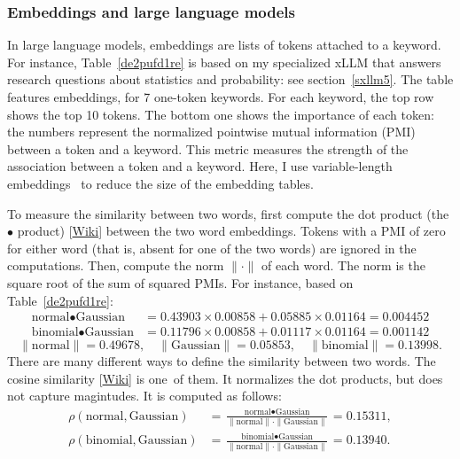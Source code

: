 \documentclass[oneside,10pt]{book}
\begin{document}
\subsubsection{Embeddings and large language models}\label{porctupues}

In large language models, embeddings are lists of tokens attached to a keyword.  For instance, Table~\ref{de2pufd1re} is based on my specialized xLLM that answers research questions about statistics and probability: see section~\ref{sxllm5}. The table features embeddings, for 7 one-token keywords. For each keyword, the top row 
 shows the top 10 tokens. The bottom one shows the importance of each token: the numbers represent the 
normalized \textcolor{index}{pointwise mutual information} (PMI) between a token and a keyword. This metric measures the strength of the association between a token and a keyword. Here, I use 
\textcolor{index}{variable-length embeddings}~\cite{vle23} to reduce the size of the embedding tables.

To measure the similarity between two words, first compute the \textcolor{index}{dot product} 
(the $\bullet$ product)
[\href{https://en.wikipedia.org/wiki/Dot_product}{Wiki}] between the two word embeddings. Tokens with a PMI of zero for either word (that is, absent for one of the two words) are ignored in the computations.
 Then, compute the norm $\|\cdot\|$ of each word. The norm is the square root of the sum of squared PMIs. For instance,
 based on Table~\ref{de2pufd1re}:
\begin{align}
\text{normal} \bullet  \text{Gaussian} & = 0.43903 \times 0.00858 + 0.05885 \times 0.01164 =  0.004452 \nonumber \\
\text{binomial} \bullet\text{Gaussian} & = 0.11796 \times 0.00858 +  0.01117 \times 0.01164 = 0.001142 \nonumber
\end{align}
$$
\| \text{normal} \| = 0.49678, \quad \| \text{Gaussian} \| =0.05853, \quad \| \text{binomial} \| = 0.13998.
$$
There are many different ways to define the similarity between two words. The
\textcolor{index}{cosine similarity}  [\href{https://en.wikipedia.org/wiki/Cosine_similarity}{Wiki}]
 is one~of them. It normalizes the dot products, but does not capture magintudes. It is computed as follows:
\begin{align}
\rho(\text{normal},  \text{Gaussian}) & = 
\frac{\text{normal} \bullet  \text{Gaussian}}{\| \text{normal} \| \cdot \| \text{Gaussian} \|}  
= 0.15311, \nonumber \\[0.5ex]
   \rho(\text{binomial}, \text{Gaussian}) & =
 \frac{\text{binomial} \bullet  \text{Gaussian}}{\| \text{normal} \| \cdot \| \text{Gaussian} \|}  
 =  0.13940. \nonumber
\end{align}
\end{document}
